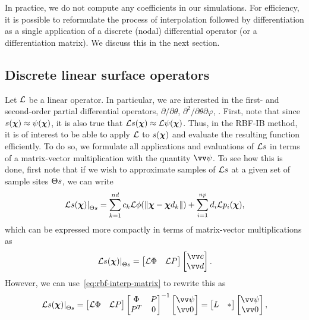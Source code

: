In practice, we do not compute any coefficients in our simulations. For efficiency, it is possible to reformulate
the process of interpolation followed by differentiation as a single application of a discrete (nodal)
differential operator (or a differentiation matrix). We discuss this in the next section.

\subsection{Discrete linear surface operators}

Let $\mathcal{L}$ be a linear operator. In particular, we are interested in the first- and second-order partial
differential operators, $\partial/\partial\theta$, $\partial^2/\partial\theta\partial\varphi$, . First,
note that since $s(\boldsymbol{\chi}) \approx \psi(\boldsymbol{\chi})$, it is also true that $\mathcal{L} s(\boldsymbol{\chi}) \approx \mathcal{L} \psi(\boldsymbol{\chi})$. Thus, in the
RBF-IB method, it is of interest to be able to apply $\mathcal{L}$ to $s(\boldsymbol{\chi})$ and evaluate the resulting
function efficiently. To do so, we formulate all applications and evaluations of $\mathcal{L} s$ in terms of a
matrix-vector multiplication with the quantity $\arr{\psi}$. To see how this is done, first note that if we wish
to approximate samples of $\mathcal{L} s$ at a given set of sample sites $\sample\sites$, we can write
\begin{align}
\left.\L s (\Xp) \right|_{\sample\sites}
    = \sum_{k=1}^{\data\cardinality} c_k \L \phi(\|\Xp-\data\Xp_k\|)
    + \sum_{i=1}^{\poly\cardinality} d_i \L p_i(\Xp),
\end{align}
which can be expressed more compactly in terms of matrix-vector multiplications as
\begin{align}
\left.\L s (\Xp) \right|_{\sample\sites} =
    \begin{bmatrix}
    \L \Phi & \L P
    \end{bmatrix}\begin{bmatrix}
    \arr{c} \\
    \arr{d}
    \end{bmatrix}.
\end{align}
However, we can use~\eqref{eq:rbf-interp-matrix} to rewrite this as
\begin{align}
\left.\L s (\Xp) \right|_{\sample\sites} =
    \begin{bmatrix}
    \L \Phi & \L P
    \end{bmatrix}\begin{bmatrix}
    \Phi & P \\
    P^T & 0
    \end{bmatrix}^{-1}\begin{bmatrix}
    \arr{\psi} \\
    \arr{0}
    \end{bmatrix} =
    \begin{bmatrix}
    L & \ast
    \end{bmatrix}\begin{bmatrix}
    \arr{\psi}\\
    \arr{0}
    \end{bmatrix},
\end{align}
